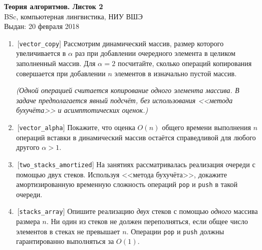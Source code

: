 \documentclass[12pt,a4paper]{report}
\begin{document}
\begin{center}
\textbf{\large{Теория алгоритмов. Листок 2}}\\
BSc, компьютерная лингвистика, НИУ ВШЭ\\
Выдан: 20 февраля 2018\\
\end{center}

\begin{enumerate}
  \item\,[{\tt vector\_copy}] Рассмотрим динамический массив, размер которого увеличивается в $\alpha$ раз при добавлении очередного элемента в целиком заполненный массив. Для $\alpha=2$ посчитайте, сколько операций копирования совершается при добавлении $n$ элементов в изначально пустой массив.

  {\it (Одной операцией считается копирование одного элемента массива. В задаче предполагается явный подсчёт, без использования <<метода бухучёта>> и асимптотических оценок.)}

  \item\,[{\tt vector\_alpha}] Покажите, что оценка $O(n)$ общего времени выполнения $n$ операций вставки в динамический массив остаётся справедливой для любого другого $\alpha > 1$.

  \item\,[{\tt two\_stacks\_amortized}] На занятиях рассматривалась реализация очереди с помощью двух стеков. Используя <<метода бухучёта>>, докажите амортизированную временную сложность операций {\tt pop} и {\tt push} в такой очереди.

  \item\,[{\tt stacks\_array}] Опишите реализацию {\em двух} стеков с помощью {\em одного} массива размера $n$. Ни один из стеков не должен переполняться, если общее число элементов в стеках не превышает $n$. Операции {\tt pop} и {\tt push} должны гарантированно выполняться за $O(1)$.
\end{enumerate}
\end{document}
